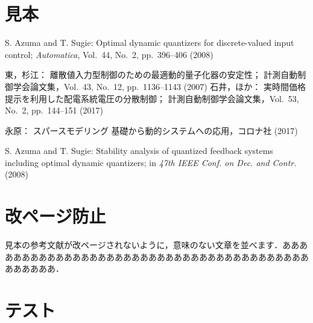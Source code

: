 \documentclass[J,amsmath]{scitrans}
\begin{document}
  \section*{見本}
    \begin{thebibliography}{9}
      S. Azuma and T. Sugie:
      Optimal dynamic quantizers for discrete-valued input control;
      {\it Automatica}, Vol.~44, No.~2, pp.~396--406 (2008)

      東，杉江：
      離散値入力型制御のための最適動的量子化器の安定性；
      計測自動制御学会論文集，Vol.~43, No.~12, pp.~1136--1143 (2007)  %
      石井，ほか：
      実時間価格提示を利用した配電系統電圧の分散制御；
      計測自動制御学会論文集，Vol.~53, No.~2, pp.~144--151 (2017)  %

      永原：
      スパースモデリング 基礎から動的システムへの応用，コロナ社 (2017)



      S. Azuma and T. Sugie:
      Stability analysis of quantized feedback systems including optimal dynamic quantizers;
      in {\it 47th IEEE Conf. on Dec. and Contr.} (2008)
    \end{thebibliography}

  \section*{改ページ防止}
    見本の参考文献が改ページされないように，意味のない文章を並べます．あああああああああああああああああああああああああああああああああああああああああああああ．


  \section*{テスト}
    
    
\end{document}

